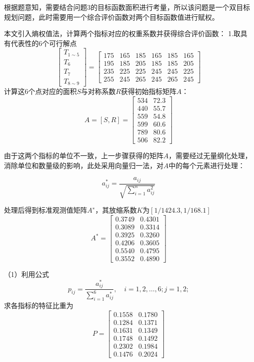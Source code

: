 \documentclass[../main.tex]{subfiles}
\begin{document}
根据题意知，需要结合问题3的目标函数面积进行考量，所以该问题是一个双目标规划问题，此时需要用一个综合评价函数对两个目标函数值进行赋权。

本文引入熵权值法，计算两个指标对应的权重系数并获得综合评价函数：
1.取具有代表性的6个可行解点
\[
\begin{bmatrix}
T_{1 \sim 5} \\
T_{6}\\
T_{7}\\
T_{8 \sim 9}
\end{bmatrix}
=
\begin{bmatrix}
175 & 165 & 185 & 165 & 185 & 165\\
195 & 185 & 205 & 185 & 185 & 205\\
235 & 225 & 225 & 245 & 245 & 225\\
255 & 245 & 265 & 245 & 265 & 245
\end{bmatrix}
\]
计算这6个点对应的面积\(S\)与对称系数\(R\)获得初始指标矩阵\(A\)：
\begin{equation}
A = [S,R] =
\begin{bmatrix}
534 & 72.3 \\
440 & 55.7 \\
559 & 54.8 \\
599 & 60.6 \\
789 & 80.6 \\
506 & 82.2
\end{bmatrix}
\end{equation}

	由于这两个指标的单位不一致，上一步骤获得的矩阵\(A\)，需要经过无量纲化处理，消除单位和数量级的影响，此处采用向量归一法，对\(A\)中的每个元素进行处理：

\begin{equation}
a_{ij} ^{*} = \frac{a_{ij}}{\sqrt{\sum_{i=1}^{n} a _{ij} ^{2}}}
\end{equation}

处理后得到标准观测值矩阵\(A^∗\)，其放缩系数\(K\)为\([1/1424.3,  1 / 168.1]\)
\[
A ^{*}
=
\begin{bmatrix}
0.3749 & 0.4301 \\
0.3089 & 0.3314 \\
0.3925 & 0.3260 \\
0.4206 & 0.3605 \\
0.5540 & 0.4795 \\
0.3552 & 0.4890
\end{bmatrix}
\]

（1）利用公式
\begin{equation}
p_{ij} = \frac{a^{*}_{ij}}{\sum_{i=1}^{6}a ^{*}_{ij}}, \quad i = 1,2 ,\dots, 6; j = 1,2;
\end{equation}
求各指标的特征比重为
\[
P =
\begin{bmatrix}
0.1558  &  0.1780 \\
0.1284  &  0.1371 \\
0.1631  &  0.1349 \\
0.1748  &  0.1492 \\
0.2302  &  0.1984 \\
0.1476  &  0.2024
\end{bmatrix}
\]
\end{document}
